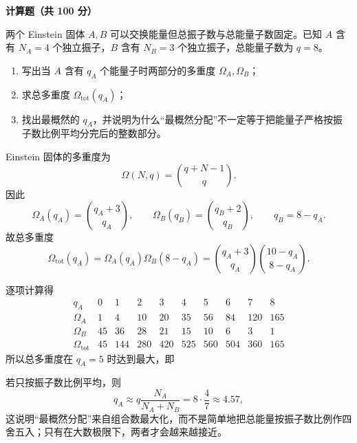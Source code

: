 ﻿


\textbf{计算题（共 100 分）}

\begin{question}[14分]
两个 Einstein 固体 $A,B$ 可以交换能量但总振子数与总能量子数固定。已知 $A$ 含有 $N_A=4$ 个独立振子，$B$ 含有 $N_B=3$ 个独立振子，总能量子数为 $q=8$。
\begin{enumerate}[label=（\arabic*）,leftmargin=2.8em,itemsep=0.2em]
\item 写出当 $A$ 含有 $q_A$ 个能量子时两部分的多重度 $\Omega_A,\Omega_B$；
\item 求总多重度 $\Omega_{\mathrm{tot}}(q_A)$；
\item 找出最概然的 $q_A$，并说明为什么“最概然分配”不一定等于把能量子严格按振子数比例平均分完后的整数部分。
\end{enumerate}
\begin{solution}

Einstein 固体的多重度为
\[
\Omega(N,q)=\binom{q+N-1}{q}.
\]
因此
\[
\Omega_A(q_A)=\binom{q_A+3}{q_A},\qquad
\Omega_B(q_B)=\binom{q_B+2}{q_B},
\qquad q_B=8-q_A.
\]
故总多重度
\[
\Omega_{\mathrm{tot}}(q_A)=\Omega_A(q_A)\Omega_B(8-q_A)
=\binom{q_A+3}{q_A}\binom{10-q_A}{8-q_A}.
\]

逐项计算得
\[
\begin{array}{c|ccccccccc}
q_A & 0&1&2&3&4&5&6&7&8\\ \hline
\Omega_A & 1&4&10&20&35&56&84&120&165\\
\Omega_B & 45&36&28&21&15&10&6&3&1\\
\Omega_{\mathrm{tot}} & 45&144&280&420&525&560&504&360&165
\end{array}
\]
所以总多重度在 $q_A=5$ 时达到最大，即

若只按振子数比例平均，则
\[
q_A\approx q\frac{N_A}{N_A+N_B}=8\cdot\frac{4}{7}\approx4.57,
\]
这说明“最概然分配”来自组合数最大化，而不是简单地把总能量按振子数比例作四舍五入；只有在大数极限下，两者才会越来越接近。
\end{solution}
\end{question}

